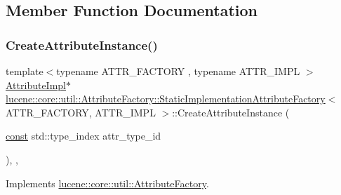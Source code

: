 \subsection{Member Function Documentation}
\mbox{\label{classlucene_1_1core_1_1util_1_1AttributeFactory_1_1StaticImplementationAttributeFactory_a06466469f2cf37e0ef599e617d415c6a}} 
\subsubsection{\texorpdfstring{Create\+Attribute\+Instance()}{CreateAttributeInstance()}}
{\footnotesize\ttfamily template$<$typename A\+T\+T\+R\+\_\+\+F\+A\+C\+T\+O\+RY , typename A\+T\+T\+R\+\_\+\+I\+M\+PL $>$ \\
\mbox{\hyperlink{classlucene_1_1core_1_1util_1_1AttributeImpl}{Attribute\+Impl}}$\ast$ \mbox{\hyperlink{classlucene_1_1core_1_1util_1_1AttributeFactory_1_1StaticImplementationAttributeFactory}{lucene\+::core\+::util\+::\+Attribute\+Factory\+::\+Static\+Implementation\+Attribute\+Factory}}$<$ A\+T\+T\+R\+\_\+\+F\+A\+C\+T\+O\+RY, A\+T\+T\+R\+\_\+\+I\+M\+PL $>$\+::Create\+Attribute\+Instance (\begin{DoxyParamCaption}\item[{\mbox{\hyperlink{ZlibCrc32_8h_a2c212835823e3c54a8ab6d95c652660e}{const}} std\+::type\+\_\+index}]{attr\+\_\+type\+\_\+id }\end{DoxyParamCaption})\hspace{0.3cm}{\ttfamily [inline]}, {\ttfamily [override]}, {\ttfamily [virtual]}}



Implements \mbox{\hyperlink{classlucene_1_1core_1_1util_1_1AttributeFactory_a88ccb9965ed78099379eaf9b1256abf3}{lucene\+::core\+::util\+::\+Attribute\+Factory}}.



